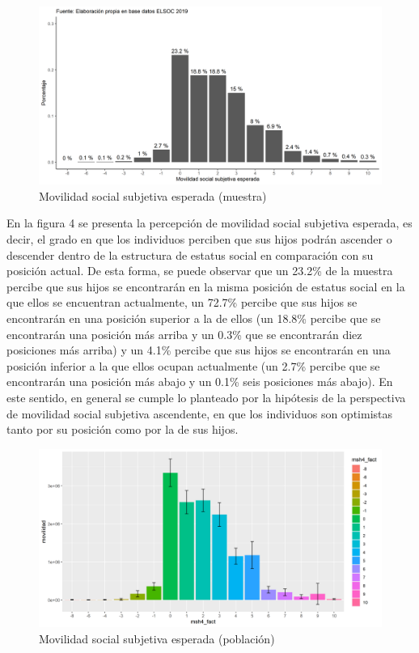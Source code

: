 \documentclass[
]{article}
\begin{document}
\begin{figure}

{\centering \includegraphics[width=0.8\linewidth,height=0.8\textheight]{output/graphs/graf2} 

}

\caption{Movilidad social subjetiva esperada (muestra)}\label{fig:unnamed-chunk-9}
\end{figure}

En la figura 4 se presenta la percepción de movilidad social subjetiva
esperada, es decir, el grado en que los individuos perciben que sus
hijos podrán ascender o descender dentro de la estructura de estatus
social en comparación con su posición actual. De esta forma, se puede
observar que un 23.2\% de la muestra percibe que sus hijos se
encontrarán en la misma posición de estatus social en la que ellos se
encuentran actualmente, un 72.7\% percibe que sus hijos se encontrarán
en una posición superior a la de ellos (un 18.8\% percibe que se
encontrarán una posición más arriba y un 0.3\% que se encontrarán diez
posiciones más arriba) y un 4.1\% percibe que sus hijos se encontrarán
en una posición inferior a la que ellos ocupan actualmente (un 2.7\%
percibe que se encontrarán una posición más abajo y un 0.1\% seis
posiciones más abajo). En este sentido, en general se cumple lo
planteado por la hipótesis de la perspectiva de movilidad social
subjetiva ascendente, en que los individuos son optimistas tanto por su
posición como por la de sus hijos.

\begin{figure}

{\centering \includegraphics[width=0.8\linewidth,height=0.8\textheight]{output/graphs/graf2_exp} 

}

\caption{Movilidad social subjetiva esperada (población)}\label{fig:unnamed-chunk-10}
\end{figure}
\end{document}
